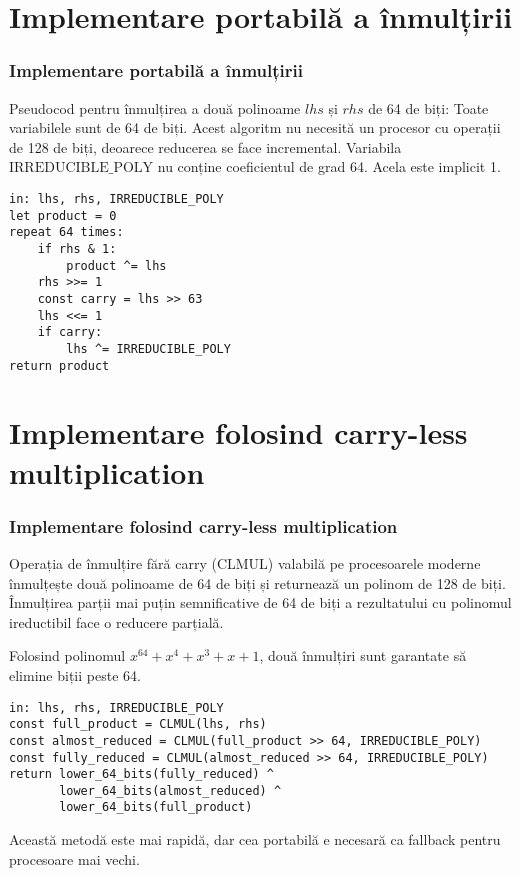 \documentclass{beamer}
\begin{document}
\section{Implementare portabilă a înmulțirii}
\begin{frame}[fragile]
\frametitle{Implementare portabilă a înmulțirii}
Pseudocod pentru înmulțirea a două polinoame $lhs$ și $rhs$ de 64 de biți:
Toate variabilele sunt de 64 de biți.
Acest algoritm nu necesită un procesor cu operații de 128 de biți, deoarece reducerea se face incremental.
Variabila $\text{IRREDUCIBLE\_POLY}$ nu conține coeficientul de grad 64. Acela este implicit 1.

\begin{verbatim}
in: lhs, rhs, IRREDUCIBLE_POLY
let product = 0
repeat 64 times:
    if rhs & 1:
        product ^= lhs
    rhs >>= 1
    const carry = lhs >> 63
    lhs <<= 1
    if carry:
        lhs ^= IRREDUCIBLE_POLY
return product
\end{verbatim}

\end{frame}

\section{Implementare folosind carry-less multiplication}
\begin{frame}[fragile]
\frametitle{Implementare folosind carry-less multiplication}
Operația de înmulțire fără carry (CLMUL) valabilă pe procesoarele moderne înmulțește două polinoame de 64 de biți și returnează un polinom de 128 de biți.
Înmulțirea parții mai puțin semnificative de 64 de biți a rezultatului cu polinomul ireductibil face o reducere parțială.

Folosind polinomul $x^{64} + x^4 + x^3 + x + 1$, două înmulțiri sunt garantate să elimine biții peste 64.

\begin{footnotesize}
\begin{verbatim}
in: lhs, rhs, IRREDUCIBLE_POLY
const full_product = CLMUL(lhs, rhs)
const almost_reduced = CLMUL(full_product >> 64, IRREDUCIBLE_POLY)
const fully_reduced = CLMUL(almost_reduced >> 64, IRREDUCIBLE_POLY)
return lower_64_bits(fully_reduced) ^
       lower_64_bits(almost_reduced) ^
       lower_64_bits(full_product)
\end{verbatim}
\end{footnotesize}

Această metodă este mai rapidă, dar cea portabilă e necesară ca fallback pentru procesoare mai vechi.

\end{frame}
\end{document}
